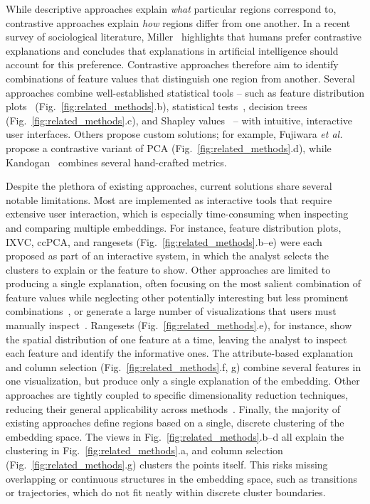\documentclass[lettersize,journal]{IEEEtran}
\newcommand{\etal}{\textit{et al.\xspace}}
\begin{document}
While descriptive approaches explain \textit{what} particular regions correspond to, contrastive approaches explain \textit{how} regions differ from one another. In a recent survey of sociological literature, Miller~\cite{Miller2019} highlights that humans prefer contrastive explanations and concludes that explanations in artificial intelligence should account for this preference.
Contrastive approaches therefore aim to identify combinations of feature values that distinguish one region from another.
Several approaches combine well-established statistical tools -- such as feature distribution plots~\cite{Stahnke2016,Eckelt2022} (Fig.~\ref{fig:related_methods}.b), statistical tests~\cite{Marcilio2021}, decision trees~\cite{Bibal2021} (Fig.~\ref{fig:related_methods}.c), and Shapley values~\cite{MarcilioEler2021} -- with intuitive, interactive user interfaces.
Others propose custom solutions; for example, Fujiwara \etal~\cite{Fujiwara2020} propose a contrastive variant of PCA (Fig.~\ref{fig:related_methods}.d), while Kandogan~\cite{Kandogan2012} combines several hand-crafted metrics.

Despite the plethora of existing approaches, current solutions share several notable limitations. Most are implemented as interactive tools that require extensive user interaction, which is especially time-consuming when inspecting and comparing multiple embeddings.
For instance, feature distribution plots, IXVC, ccPCA, and rangesets (Fig.~\ref{fig:related_methods}.b--e) were each proposed as part of an interactive system, in which the analyst selects the clusters to explain or the feature to show.
Other approaches are limited to producing a single explanation, often focusing on the most salient combination of feature values while neglecting other potentially interesting but less prominent combinations~\cite{DaSilva2015,VanDriel2020,Tian2021,Bibal2021}, or generate a large number of visualizations that users must manually inspect~\cite{Faust2019,Plumb2020}.
Rangesets (Fig.~\ref{fig:related_methods}.e), for instance, show the spatial distribution of one feature at a time, leaving the analyst to inspect each feature and identify the informative ones.
The attribute-based explanation and column selection (Fig.~\ref{fig:related_methods}.f, g) combine several features in one visualization, but produce only a single explanation of the embedding.
Other approaches are tightly coupled to specific dimensionality reduction techniques, reducing their general applicability across methods~\cite{Chatzimparmpas2020,Broeksema2013,ChengMueller2016}. Finally, the majority of existing approaches define regions based on a single, discrete clustering of the embedding space.
The views in Fig.~\ref{fig:related_methods}.b--d all explain the clustering in Fig.~\ref{fig:related_methods}.a, and column selection (Fig.~\ref{fig:related_methods}.g) clusters the points itself. This risks missing overlapping or continuous structures in the embedding space, such as transitions or trajectories, which do not fit neatly within discrete cluster boundaries.
\end{document}
